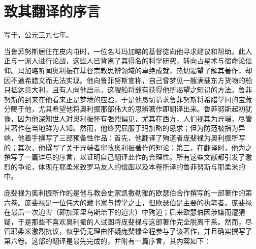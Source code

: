\section{致其翻译的序言}

写于，公元三九七年。\par

当鲁菲努斯居住在皮内屯时，一位名叫玛加略的基督徒向他寻求建议和帮助。此人正与一派人进行论战，这些人已背离了其得名的科学研究，转向占星术与宿命论信仰。玛加略听闻奥利振在基督宗教思辨领域的卓绝成就，热切渴望了解其著作，却因不通希腊文而无法实现。他向鲁菲努斯宣称，自己曾梦见一艘满载东方货物的船只抵达意大利，且有人向他启示，这艘船将载有获得他所渴望之知识的方法。鲁菲努斯的到来在他看来正是梦境的应验，于是他恳切请求鲁菲努斯将希腊学问的宝藏分赐于他，尤其希望他将奥利振那部伟大的思辨著作即翻译出来。鲁菲努斯起初犹豫，因为他深知世人对奥利振怀有强烈偏见，尤其在西方，人们视其为异端，尽管其著作在当地鲜为人知。然而，他终究屈服于玛加略的恳求；但为防范被指为异端，他着手撰写了三部预备性作品：首先，他翻译了殉道者庞斐禄为奥利振所写的；其次，他撰写了关于异端者窜改奥利振著作的短论；第三，在翻译时，他为之撰写了一篇详尽的序言，以证明自己翻译此作的合理性。所有这些文献都引发了激烈的争论，体现在耶柔米致罗马友人的信函以及本卷所译的鲁菲努斯与耶柔米的中。\par

庞斐禄为奥利振所作的是他与教会史家凯撒勒雅的欧瑟伯合作撰写的一部著作的第六卷。庞斐禄是一位伟大的藏书家与博学之士，但欧瑟伯是主要的执笔者。庞斐禄在最后一次迫害（即加莱里乌斯治下的迫害）中殉道；后来欧瑟伯因涉嫌而遭猜疑，于是那些不喜欢奥利振的人试图将庞斐禄与这部著作完全脱离干系。然而，尽管耶柔米激烈抗议，似乎仍无理由怀疑庞斐禄全程参与了该著作，并且确实撰写了第六卷。这部的翻译是最先完成的，并附有一篇序言，其内容如下：\par

